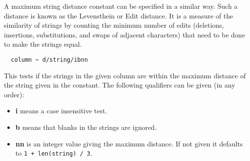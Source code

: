 A maximum string distance constant can be specified in a similar way.
Such a distance is known as the Levensthein or Edit distance.
It is a measure
of the similarity of strings by counting the minimum number of edits
(deletions, insertions, substitutions, and swaps of adjacent
characters) that need to be done to make the strings equal.
\begin{verbatim}
  column ~ d/string/ibnn
\end{verbatim}
This tests if the strings in the given column are within the maximum
distance of the string given in the constant. The following qualifiers
can be given (in any order):
\begin{itemize}
  \item \textbf{i} means a case insensitive test.
  \item \textbf{b} means that blanks in the strings are ignored.
  \item \textbf{nn} is an integer value giving the maximum
    distance. If not given it defaults to \texttt{1 + len(string) / 3}.
\end{itemize}

